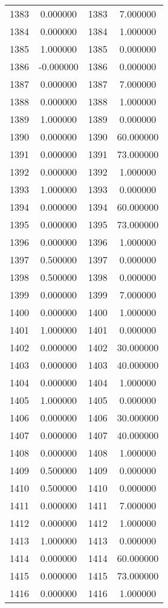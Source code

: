 \documentclass[12pt]{article}
\begin{document}
\begin{longtable}{@{}cccc@{}}
1383 & 0.000000 & 1383 & 7.000000 \\
1384 & 0.000000 & 1384 & 1.000000 \\
1385 & 1.000000 & 1385 & 0.000000 \\
1386 & -0.000000 & 1386 & 0.000000 \\
1387 & 0.000000 & 1387 & 7.000000 \\
1388 & 0.000000 & 1388 & 1.000000 \\
1389 & 1.000000 & 1389 & 0.000000 \\
1390 & 0.000000 & 1390 & 60.000000 \\
1391 & 0.000000 & 1391 & 73.000000 \\
1392 & 0.000000 & 1392 & 1.000000 \\
1393 & 1.000000 & 1393 & 0.000000 \\
1394 & 0.000000 & 1394 & 60.000000 \\
1395 & 0.000000 & 1395 & 73.000000 \\
1396 & 0.000000 & 1396 & 1.000000 \\
1397 & 0.500000 & 1397 & 0.000000 \\
1398 & 0.500000 & 1398 & 0.000000 \\
1399 & 0.000000 & 1399 & 7.000000 \\
1400 & 0.000000 & 1400 & 1.000000 \\
1401 & 1.000000 & 1401 & 0.000000 \\
1402 & 0.000000 & 1402 & 30.000000 \\
1403 & 0.000000 & 1403 & 40.000000 \\
1404 & 0.000000 & 1404 & 1.000000 \\
1405 & 1.000000 & 1405 & 0.000000 \\
1406 & 0.000000 & 1406 & 30.000000 \\
1407 & 0.000000 & 1407 & 40.000000 \\
1408 & 0.000000 & 1408 & 1.000000 \\
1409 & 0.500000 & 1409 & 0.000000 \\
1410 & 0.500000 & 1410 & 0.000000 \\
1411 & 0.000000 & 1411 & 7.000000 \\
1412 & 0.000000 & 1412 & 1.000000 \\
1413 & 1.000000 & 1413 & 0.000000 \\
1414 & 0.000000 & 1414 & 60.000000 \\
1415 & 0.000000 & 1415 & 73.000000 \\
1416 & 0.000000 & 1416 & 1.000000 \\

\end{longtable}
\end{document}
